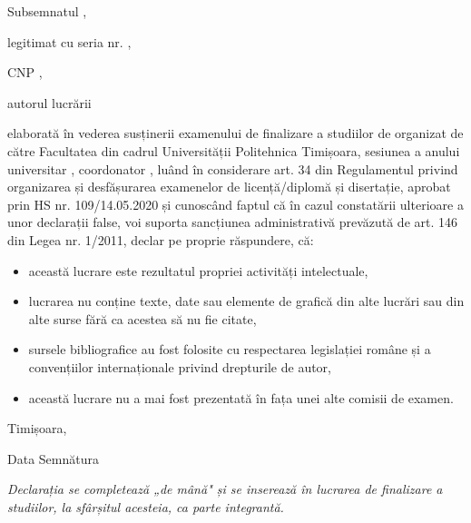 \documentclass[12pt, twoside, a4paper]{report}
\begin{document}
\vspace{8pt}

Subsemnatul \underline{\hspace{8cm}},

legitimat cu \underline{\hspace{3cm}} seria \underline{\hspace{1.5cm}}
nr. \underline{\hspace{3cm}},

CNP \underline{\hspace{8cm}},

autorul lucrării \underline{\hspace{10cm}}

\vspace{6pt}
\noindent elaborată în vederea susținerii examenului de finalizare a studiilor de
\underline{\hspace{4cm}} organizat de către Facultatea
\underline{\hspace{5cm}} din cadrul Universității Politehnica Timișoara,
sesiunea \underline{\hspace{2.5cm}} a anului universitar \underline{\hspace{2cm}},
coordonator \underline{\hspace{4cm}}, luând în considerare art. 34 din Regulamentul
privind organizarea și desfășurarea examenelor de licență/diplomă și disertație,
aprobat prin HS nr. 109/14.05.2020 și cunoscând faptul că în cazul constatării
ulterioare a unor declarații false, voi suporta sancțiunea administrativă prevăzută
de art. 146 din Legea nr. 1/2011, declar pe proprie răspundere, că:

\begin{itemize}
  \item această lucrare este rezultatul propriei activități intelectuale,
  \item lucrarea nu conține texte, date sau elemente de grafică din alte lucrări sau
        din alte surse fără ca acestea să nu fie citate,
  \item sursele bibliografice au fost folosite cu respectarea legislației române și a
        convențiilor internaționale privind drepturile de autor,
  \item această lucrare nu a mai fost prezentată în fața unei alte comisii de examen.
\end{itemize}

\vspace{1.5cm}

\noindent Timișoara,

\noindent Data \underline{\hspace{4cm}} \hfill Semnătura \underline{\hspace{5cm}}

\vspace{0.5cm}

{\footnotesize\textit{Declarația se completează „de mână" și se inserează în lucrarea
de finalizare a studiilor, la sfârșitul acesteia, ca parte integrantă.}}


\end{document}
